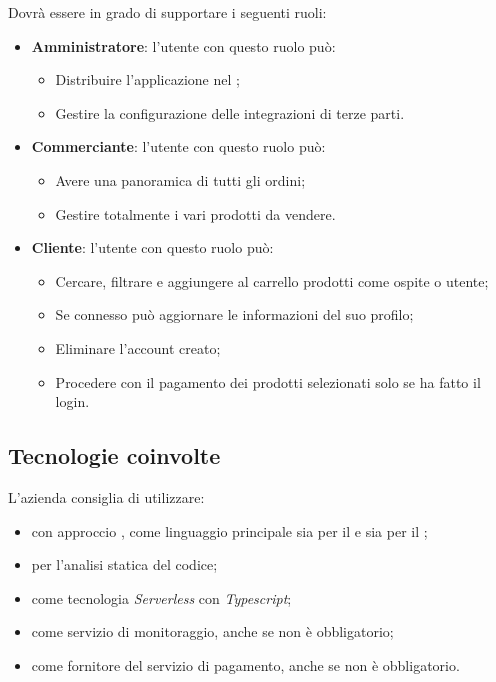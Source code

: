 Dovrà essere in grado di supportare i seguenti ruoli:
\begin{itemize}
	\item \textbf{Amministratore}: l'utente con questo ruolo può:
		\begin{itemize}
			\item Distribuire l'applicazione nel ;
			\item Gestire la configurazione delle integrazioni di terze parti.
		\end{itemize}
	\item \textbf{Commerciante}: l'utente con questo ruolo può:
		\begin{itemize}
			\item Avere una panoramica di tutti gli ordini;
			\item Gestire totalmente i vari prodotti da vendere.
		\end{itemize}
	\item \textbf{Cliente}: l'utente con questo ruolo può:
	\begin{itemize}
		\item Cercare, filtrare e aggiungere al carrello prodotti come ospite o utente;
		\item Se connesso può aggiornare le informazioni del suo profilo;
		\item Eliminare l'account creato;
		\item Procedere con il pagamento dei prodotti selezionati solo se ha fatto il login.
	\end{itemize}
\end{itemize}

\subsection{Tecnologie coinvolte}
L'azienda consiglia di utilizzare:
\begin{itemize}
	\item \textit{} con approccio \textit{}, come linguaggio principale sia per il  e sia per il ;
	\item \textit{}per l'analisi statica del codice;
	\item \textit{} come tecnologia \textit{Serverless} con \textit{Typescript};
	\item \textit{} come servizio di monitoraggio, anche se non è obbligatorio;
	\item \textit{} come fornitore del servizio di pagamento, anche se non è obbligatorio.
 \end{itemize}

